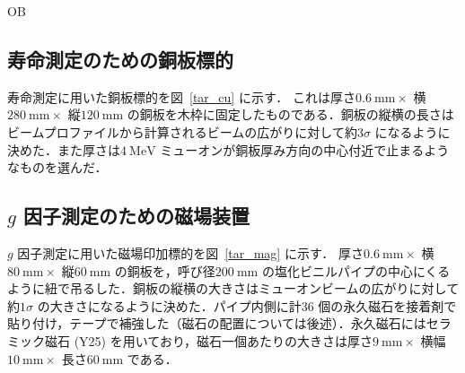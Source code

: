 OB%
 



%

\newpage

\subsection{寿命測定のための銅板標的}

寿命測定に用いた銅板標的を図~\ref{tar_cu} に示す．
これは厚さ$0.6~\mathrm{mm} \times$ 横$280~\mathrm{mm} \times$ 縦$120~\mathrm{mm}$ の銅板を木枠に固定したものである．銅板の縦横の長さはビームプロファイルから計算されるビームの広がりに対して約$3\sigma$ になるように決めた．また厚さは$4~\mathrm{MeV}$ ミューオンが銅板厚み方向の中心付近で止まるようなものを選んだ．

\subsection{$g$ 因子測定のための磁場装置}

$g$ 因子測定に用いた磁場印加標的を図~\ref{tar_mag} に示す．
厚さ$0.6~\mathrm{mm} \times$ 横$80~\mathrm{mm} \times$ 縦$60~\mathrm{mm}$ の銅板を，呼び径$200~\mathrm{mm}$ の塩化ビニルパイプの中心にくるように紐で吊るした．銅板の縦横の大きさはミューオンビームの広がりに対して約$1\sigma$ の大きさになるように決めた．パイプ内側に計36 個の永久磁石を接着剤で貼り付け，テープで補強した（磁石の配置については後述）．永久磁石にはセラミック磁石 (Y25) を用いており，磁石一個あたりの大きさは厚さ$9~\mathrm{mm} \times$ 横幅$10~\mathrm{mm} \times$ 長さ$60~\mathrm{mm}$ である．

